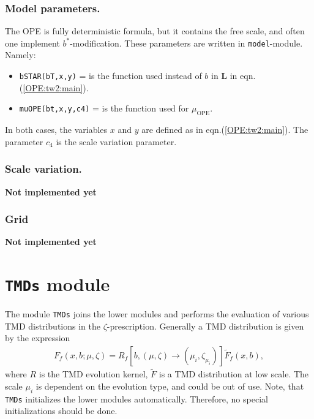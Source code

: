 \documentclass[prd,nofootinbib,eqsecnum,final]{revtex4}
\renewcommand{\(}{\left(}
\renewcommand{\)}{\right)}
\renewcommand{\[}{\left[}
\renewcommand{\]}{\right]}
\begin{document}
\subsubsection{Model parameters.} 

The OPE is fully deterministic formula, but it contains the free scale, and often one implement $b^*$-modification. These parameters are written in \texttt{model}-module. Namely:
\begin{itemize}
\item \texttt{bSTAR(bT,x,y)} = is the function used instead of $b$ in  $\mathbf{L}$ in eqn.(\ref{OPE:tw2:main}).
\item \texttt{muOPE(bt,x,y,c4)} = is the function used for $\mu_{\text{OPE}}$.
\end{itemize}
In both cases, the variables $x$ and $y$ are defined as in eqn.(\ref{OPE:tw2:main}). The parameter $c_4$ is the scale variation parameter.

\subsubsection{Scale variation.} 

\textbf{Not implemented yet}

\subsubsection{Grid}
\label{sec:OPEtw3:grid1}

\textbf{Not implemented yet}

\renewcommand{\arraystretch}{1.5}
\newpage


\section{\texttt{TMDs} module}
\label{TMDs}

The module \texttt{TMDs} joins the lower modules and performs the evaluation of various TMD distributions in the $\zeta$-prescription. Generally a TMD distribution is given by the expression
\begin{eqnarray}
F_f(x,b;\mu,\zeta)=R_f[b,(\mu,\zeta)\to(\mu_i,\zeta_{\mu_i})]\tilde F_f(x,b),
\end{eqnarray}
where $R$ is the TMD evolution kernel, $\tilde F$ is a TMD distribution at low scale. The scale $\mu_i$ is dependent on the evolution type, and could be out of use. Note, that \texttt{TMDs} initializes the lower modules automatically. Therefore, no special initializations should be done.
\end{document}
